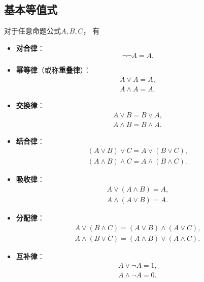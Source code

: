 \subsection{基本等值式}
\begin{theorem}\label{theorem:数理逻辑.基本等值式}
对于任意命题公式\(A,B,C\)，
有\begin{itemize}
	\item {\rm\bf 对合律}：\begin{equation}
		\neg\neg A = A.
	\end{equation}

	\item {\rm\bf 幂等律}（或称{\rm\bf 重叠律}）：\begin{gather}
		A \lor A = A, \\
		A \land A = A.
	\end{gather}

	\item {\rm\bf 交换律}：\begin{gather}
		A \lor B = B \lor A, \\
		A \land B = B \land A.
	\end{gather}

	\item {\rm\bf 结合律}：\begin{gather}
		(A \lor B) \lor C = A \lor (B \lor C), \\
		(A \land B) \land C = A \land (B \land C).
	\end{gather}

	\item {\rm\bf 吸收律}：\begin{gather}
		A \lor (A \land B) = A, \\
		A \land (A \lor B) = A.
	\end{gather}

	\item {\rm\bf 分配律}：\begin{gather}
		A \lor (B \land C) = (A \lor B) \land (A \lor C), \\
		A \land (B \lor C) = (A \land B) \lor (A \land C).
	\end{gather}

	\item {\rm\bf 互补律}：\begin{gather}
		A \lor \neg A = 1, \\
		A \land \neg A = 0.
	\end{gather}


\end{itemize}
\end{theorem}
